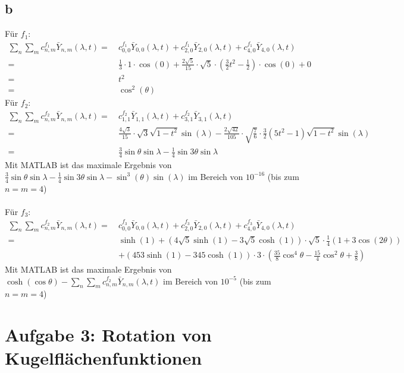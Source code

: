 \subsection{b}
Für $f_1$: 
\begin{align}
	\sum_n \sum_m c_{n,m}^{f_1} \bar{Y}_{n,m}(\lambda,t)  = \ & c_{0,0}^{f_1} \bar{Y}_{0,0}(\lambda,t) + c_{2,0}^{f_1} \bar{Y}_{2,0}(\lambda,t) +c_{4,0}^{f_1} \bar{Y}_{4,0}(\lambda,t) \\
	   = \ & \frac{1}{3} \cdot 1 \cdot \cos(0) + \frac{2\sqrt{5}}{15} \cdot \sqrt{5} \cdot (\frac{3}{2}t^2 - \frac{1}{2}) \cdot \cos(0) + 0 \\
	   = \ & t^2 \\
	   = \ & \cos^2(\theta)
\end{align}
Für $f_2$:
\begin{align}
	\sum_n \sum_m c_{n,m}^{f_2} \bar{Y}_{n,m}(\lambda,t) = \ & c_{1,1}^{f_2} \bar{Y}_{1,1}(\lambda,t) + c_{3,1}^{f_2} \bar{Y}_{3,1}(\lambda,t) \\
	= \ & \frac{4\sqrt{3}}{15} \cdot  \sqrt{3} \sqrt{1-t^2} \sin(\lambda) - \frac{2\sqrt{42}}{105} \cdot \sqrt{\frac{7}{6}}\cdot \frac{3}{2}(5t^2-1)\sqrt{1-t^2} \sin(\lambda) \\
	= \ & \frac{3}{4} \sin \theta \sin \lambda - \frac{1}{4} \sin3\theta \sin \lambda
\end{align}
Mit MATLAB ist das maximale Ergebnis von $\frac{3}{4} \sin \theta \sin \lambda - \frac{1}{4} \sin3\theta \sin \lambda - \sin^3(\theta)\sin(\lambda)$ im Bereich von $10^{-16}$ (bis zum $n = m = 4$)\\\\
Für $f_3$:
\begin{align}
	\sum_n \sum_m c_{n,m}^{f_2} \bar{Y}_{n,m}(\lambda,t) = \ & c_{0,0}^{f_3} \bar{Y}_{0,0}(\lambda,t) + c_{2,0}^{f_3} \bar{Y}_{2,0}(\lambda,t) + c_{4,0}^{f_3} \bar{Y}_{4,0}(\lambda,t) \\
	= \ & \sinh(1) + (4\sqrt{5}\sinh(1)-3\sqrt{5}\cosh(1)) \cdot \sqrt{5} \cdot \frac{1}{4}(1+3\cos(2\theta)) \\
	& + (453\sinh(1) - 345\cosh(1)) \cdot 3 \cdot (\frac{35}{8}\cos^4\theta - \frac{15}{4}\cos^2\theta + \frac{3}{8})
\end{align}
Mit MATLAB ist das maximale Ergebnis von $\cosh(\cos \theta) -\sum_n \sum_m c_{n,m}^{f_2} \bar{Y}_{n,m}(\lambda,t) $ im Bereich von $10^{-5}$ (bis zum $n = m = 4$)

\section{Aufgabe 3: Rotation von Kugelflächenfunktionen}

